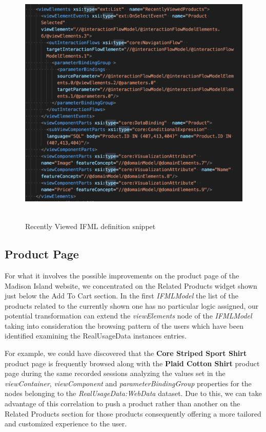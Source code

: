 \vspace{0.5cm}
\begin{figure}[H]
  \centering
    \includegraphics[height=12cm]{images/madison/ifml-recently-viewed.png}
  \caption{Recently Viewed IFML definition snippet}
  \label{fig:recently-viewed-ifml-definition}
\end{figure}
\vspace{0.5cm}

\subsection{Product Page}
\label{product-page-updates}

For what it involves the possible improvements on the product page of the Madison Island website, we concentrated on the Related Products widget shown just below the Add To Cart section. In the first \textit{IFMLModel} the list of the products related to the currently shown one has no particular logic assigned, our potential transformation can extend the \textit{viewElements} node of the \textit{IFMLModel} taking into consideration the browsing pattern of the users which have been identified examining the RealUsageData instances entries.

For example, we could have discovered that the \textbf{Core Striped Sport Shirt} product page is frequently browsed along with the \textbf{Plaid Cotton Shirt} product page during the same recorded sessions analyzing the values set in the \textit{viewContainer}, \textit{viewComponent} and \textit{parameterBindingGroup} properties for the nodes belonging to the \textit{RealUsageData:WebData} dataset. Due to this, we can take advantage of this correlation to push a product rather than another on the Related Products section for those products consequently offering a more tailored and customized experience to the user.

